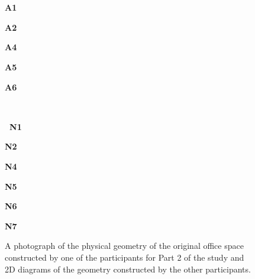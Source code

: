 \begin{figure}[t]
\begin{center}
\vspace{-0.215\textwidth}
\\
\begin{small}
\newcommand{\figwidth}{0.135\textwidth}
\begin{minipage}{0.27\textwidth}~\end{minipage}
\begin{minipage}{\figwidth}{\bf A1}\end{minipage}
\begin{minipage}{\figwidth}{\bf A2}\end{minipage}
\begin{minipage}{\figwidth}{\bf A4}\end{minipage}
\begin{minipage}{\figwidth}{\bf A5}\end{minipage}
\begin{minipage}{\figwidth}{\bf A6}\end{minipage}
\vspace{0.105\textwidth}
\\
\begin{minipage}{0.27\textwidth}{\bf ~N1}\end{minipage}
\begin{minipage}{\figwidth}{\bf N2}\end{minipage}
\begin{minipage}{\figwidth}{\bf N4}\end{minipage}
\begin{minipage}{\figwidth}{\bf N5}\end{minipage}
\begin{minipage}{\figwidth}{\bf N6}\end{minipage}
\begin{minipage}{\figwidth}{\bf N7}\end{minipage}\vspace{-0.15in}%
\end{small}
\end{center}
  \caption{
  \label{figure:original_designs}
A photograph of the physical geometry of the original office space
constructed by one of the participants for Part 2 of the study and 2D
diagrams of the geometry constructed by the other participants. 
}
\end{figure}
